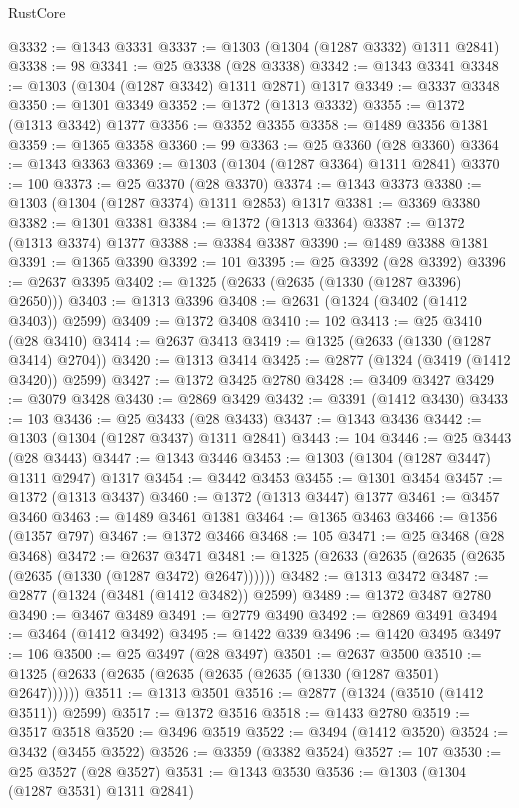 \begin{lexlean}{RustCore}
\begin{coremodule}
@3332 := @1343 @3331
@3337 := @1303 (@1304 (@1287 @3332) @1311 @2841)
@3338 := 98
@3341 := @25 @3338 (@28 @3338)
@3342 := @1343 @3341
@3348 := @1303 (@1304 (@1287 @3342) @1311 @2871) @1317
@3349 := @3337 @3348
@3350 := @1301 @3349
@3352 := @1372 (@1313 @3332)
@3355 := @1372 (@1313 @3342) @1377
@3356 := @3352 @3355
@3358 := @1489 @3356 @1381
@3359 := @1365 @3358
@3360 := 99
@3363 := @25 @3360 (@28 @3360)
@3364 := @1343 @3363
@3369 := @1303 (@1304 (@1287 @3364) @1311 @2841)
@3370 := 100
@3373 := @25 @3370 (@28 @3370)
@3374 := @1343 @3373
@3380 := @1303 (@1304 (@1287 @3374) @1311 @2853) @1317
@3381 := @3369 @3380
@3382 := @1301 @3381
@3384 := @1372 (@1313 @3364)
@3387 := @1372 (@1313 @3374) @1377
@3388 := @3384 @3387
@3390 := @1489 @3388 @1381
@3391 := @1365 @3390
@3392 := 101
@3395 := @25 @3392 (@28 @3392)
@3396 := @2637 @3395
@3402 := @1325 (@2633 (@2635 (@1330 (@1287 @3396) @2650)))
@3403 := @1313 @3396
@3408 := @2631 (@1324 (@3402 (@1412 @3403)) @2599)
@3409 := @1372 @3408
@3410 := 102
@3413 := @25 @3410 (@28 @3410)
@3414 := @2637 @3413
@3419 := @1325 (@2633 (@1330 (@1287 @3414) @2704))
@3420 := @1313 @3414
@3425 := @2877 (@1324 (@3419 (@1412 @3420)) @2599)
@3427 := @1372 @3425 @2780
@3428 := @3409 @3427
@3429 := @3079 @3428
@3430 := @2869 @3429
@3432 := @3391 (@1412 @3430)
@3433 := 103
@3436 := @25 @3433 (@28 @3433)
@3437 := @1343 @3436
@3442 := @1303 (@1304 (@1287 @3437) @1311 @2841)
@3443 := 104
@3446 := @25 @3443 (@28 @3443)
@3447 := @1343 @3446
@3453 := @1303 (@1304 (@1287 @3447) @1311 @2947) @1317
@3454 := @3442 @3453
@3455 := @1301 @3454
@3457 := @1372 (@1313 @3437)
@3460 := @1372 (@1313 @3447) @1377
@3461 := @3457 @3460
@3463 := @1489 @3461 @1381
@3464 := @1365 @3463
@3466 := @1356 (@1357 @797)
@3467 := @1372 @3466
@3468 := 105
@3471 := @25 @3468 (@28 @3468)
@3472 := @2637 @3471
@3481 := @1325 (@2633 (@2635 (@2635 (@2635 (@2635 (@1330 (@1287 @3472) @2647))))))
@3482 := @1313 @3472
@3487 := @2877 (@1324 (@3481 (@1412 @3482)) @2599)
@3489 := @1372 @3487 @2780
@3490 := @3467 @3489
@3491 := @2779 @3490
@3492 := @2869 @3491
@3494 := @3464 (@1412 @3492)
@3495 := @1422 @339
@3496 := @1420 @3495
@3497 := 106
@3500 := @25 @3497 (@28 @3497)
@3501 := @2637 @3500
@3510 := @1325 (@2633 (@2635 (@2635 (@2635 (@2635 (@1330 (@1287 @3501) @2647))))))
@3511 := @1313 @3501
@3516 := @2877 (@1324 (@3510 (@1412 @3511)) @2599)
@3517 := @1372 @3516
@3518 := @1433 @2780
@3519 := @3517 @3518
@3520 := @3496 @3519
@3522 := @3494 (@1412 @3520)
@3524 := @3432 (@3455 @3522)
@3526 := @3359 (@3382 @3524)
@3527 := 107
@3530 := @25 @3527 (@28 @3527)
@3531 := @1343 @3530
@3536 := @1303 (@1304 (@1287 @3531) @1311 @2841)

\end{coremodule}
\end{lexlean}
